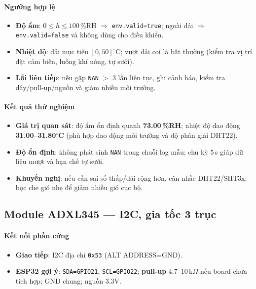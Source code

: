 \paragraph{Ngưỡng hợp lệ}
\begin{itemize}
  \item \textbf{Độ ẩm}: $0 \le h \le 100$\,\%RH $\Rightarrow$ \texttt{env.valid=true}; ngoài dải $\Rightarrow$ \texttt{env.valid=false} và không dùng cho điều khiển.
  \item \textbf{Nhiệt độ}: dải mục tiêu $[0,50]^\circ$C; vượt dải coi là bất thường (kiểm tra vị trí đặt cảm biến, luồng khí nóng, tự sưởi).
  \item \textbf{Lỗi liên tiếp}: nếu gặp \texttt{NAN} $>$ 3 lần liên tục, ghi cảnh báo, kiểm tra dây/pull-up/nguồn và giảm nhiễu môi trường.
\end{itemize}

\paragraph{Kết quả thử nghiệm}
\begin{itemize}
  \item \textbf{Giá trị quan sát}: độ ẩm ổn định quanh \textbf{73.00\,\%RH}; nhiệt độ dao động \textbf{31.00–31.80$^\circ$C} (phù hợp dao động môi trường và độ phân giải DHT22).
  \item \textbf{Độ ổn định}: không phát sinh \texttt{NAN} trong chuỗi log mẫu; chu kỳ 5\,s giúp dữ liệu mượt và hạn chế tự sưởi.
  \item \textbf{Khuyến nghị}: nếu cần sai số thấp/dải rộng hơn, cân nhắc DHT22/SHT3x; bọc che gió nhẹ để giảm nhiễu gió cục bộ.
\end{itemize}


\subsection{Module ADXL345 — I2C, gia tốc 3 trục}

\paragraph{Kết nối phần cứng}
\begin{itemize}
  \item \textbf{Giao tiếp}: I2C địa chỉ \texttt{0x53} (ALT ADDRESS=GND). 
  \item \textbf{ESP32 gợi ý}: \texttt{SDA=GPIO21}, \texttt{SCL=GPIO22}; \textbf{pull-up} 4.7–10\,k$\Omega$ nếu board chưa tích hợp; GND chung; nguồn 3.3V.
\end{itemize}

